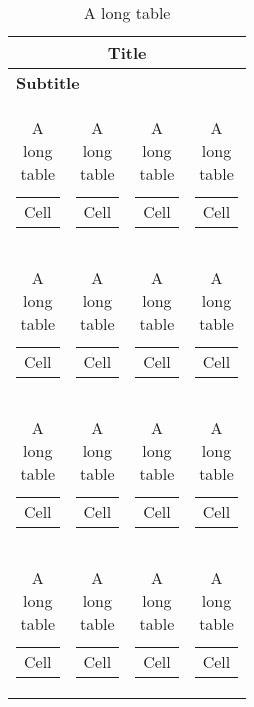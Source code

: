 \begin{longtable}{|l|l|l|l|}

\caption{A long table}\label{table:long_table}\\

\hline

\multicolumn{4}{|c|}{{\textbf{Title}}} \\ \hline
\multicolumn{4}{|l|}{\textbf{Subtitle}} \\ \hline

\begin{tabular}[c]{@{}l@{}} Cell \end{tabular} &
\begin{tabular}[c]{@{}l@{}} Cell \end{tabular} &
\begin{tabular}[c]{@{}l@{}} Cell \end{tabular} & 
\begin{tabular}[c]{@{}l@{}} Cell \end{tabular} \\ \hline

\begin{tabular}[c]{@{}l@{}} Cell \end{tabular} &
\begin{tabular}[c]{@{}l@{}} Cell \end{tabular} &
\begin{tabular}[c]{@{}l@{}} Cell \end{tabular} & 
\begin{tabular}[c]{@{}l@{}} Cell \end{tabular} \\ \hline

\begin{tabular}[c]{@{}l@{}} Cell \end{tabular} &
\begin{tabular}[c]{@{}l@{}} Cell \end{tabular} &
\begin{tabular}[c]{@{}l@{}} Cell \end{tabular} & 
\begin{tabular}[c]{@{}l@{}} Cell \end{tabular} \\ \hline

\begin{tabular}[c]{@{}l@{}} Cell \end{tabular} &
\begin{tabular}[c]{@{}l@{}} Cell \end{tabular} &
\begin{tabular}[c]{@{}l@{}} Cell \end{tabular} & 
\begin{tabular}[c]{@{}l@{}} Cell \end{tabular} \\ \hline


\end{longtable}
